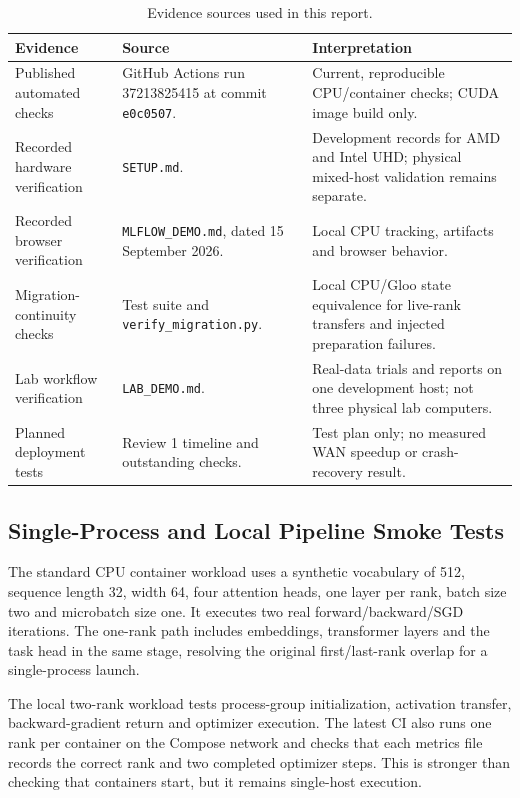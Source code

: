 \begin{table}[H]
\centering\small
\caption{Evidence sources used in this report.}
\begin{tabularx}{\textwidth}{P{2.9cm}YY}
\toprule
\textbf{Evidence} & \textbf{Source} & \textbf{Interpretation}\\
\midrule
Published automated checks & GitHub Actions run 37213825415 at commit \texttt{e0c0507}. & Current, reproducible CPU/container checks; CUDA image build only.\\
Recorded hardware verification & \texttt{SETUP.md}. & Development records for AMD and Intel UHD; physical mixed-host validation remains separate.\\
Recorded browser verification & \texttt{MLFLOW\_DEMO.md}, dated 15 September 2026. & Local CPU tracking, artifacts and browser behavior.\\
Migration-continuity checks & Test suite and \texttt{verify\_migration.py}. & Local CPU/Gloo state equivalence for live-rank transfers and injected preparation failures.\\
Lab workflow verification & \texttt{LAB\_DEMO.md}. & Real-data trials and reports on one development host; not three physical lab computers.\\
Planned deployment tests & Review 1 timeline and outstanding checks. & Test plan only; no measured WAN speedup or crash-recovery result.\\
\bottomrule
\end{tabularx}
\end{table}

\subsection{Single-Process and Local Pipeline Smoke Tests}

The standard CPU container workload uses a synthetic vocabulary of 512, sequence length 32, width 64, four attention heads, one layer per rank, batch size two and microbatch size one. It executes two real forward/backward/SGD iterations. The one-rank path includes embeddings, transformer layers and the task head in the same stage, resolving the original first/last-rank overlap for a single-process launch.

The local two-rank workload tests process-group initialization, activation transfer, backward-gradient return and optimizer execution. The latest CI also runs one rank per container on the Compose network and checks that each metrics file records the correct rank and two completed optimizer steps. This is stronger than checking that containers start, but it remains single-host execution.

